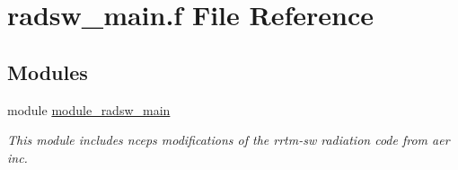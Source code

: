 \hypertarget{radsw__main_8f}{}\section{radsw\+\_\+main.\+f File Reference}
\label{radsw__main_8f}
\subsection*{Modules}
\begin{DoxyCompactItemize}
\item 
module \hyperlink{namespacemodule__radsw__main}{module\+\_\+radsw\+\_\+main}
\begin{DoxyCompactList}\small\item\em This module includes ncep\textquotesingle{}s modifications of the rrtm-\/sw radiation code from aer inc. \end{DoxyCompactList}\end{DoxyCompactItemize}
